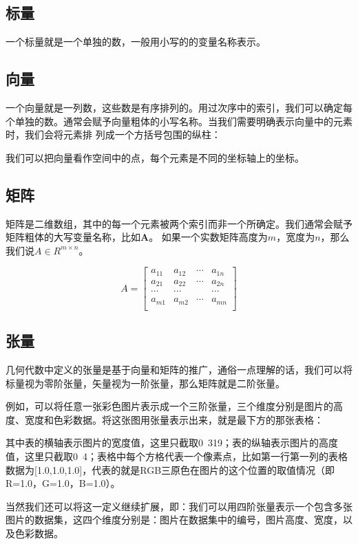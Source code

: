 \documentclass[11pt]{book}
\newcounter{#2}
\newcounter{#2}[#1]
\numberwithin{#2}{#1}
\begin{document}
\subsection{标量}
一个标量就是一个单独的数，一般用小写的的变量名称表示。
\subsection{向量}
一个向量就是一列数，这些数是有序排列的。用过次序中的索引，我们可以确定每个单独的数。通常会赋予向量粗体的小写名称。当我们需要明确表示向量中的元素时，我们会将元素排
列成一个方括号包围的纵柱：

我们可以把向量看作空间中的点，每个元素是不同的坐标轴上的坐标。

\subsection{矩阵}
矩阵是二维数组，其中的每一个元素被两个索引而非一个所确定。我们通常会赋予矩阵粗体的大写变量名称，比如\textbf{A}。 如果一个实数矩阵高度为$ m $，宽度为$ n $，那么我们说$ A \in R^{m \times n} $。
\begin{center}
	\begin{equation}
  A= \begin{bmatrix} a_{11} & a_{12} & \cdots & a_{1n}\\ a_{21} & a_{22} & \cdots & a_{2n}\\ \cdots & \cdots & & \cdots\\ a_{m1} & a_{m2} & \cdots & a_{mn}\\ \end{bmatrix}
  \end{equation}
\end{center}
\subsection{张量}
几何代数中定义的张量是基于向量和矩阵的推广，通俗一点理解的话，我们可以将标量视为零阶张量，矢量视为一阶张量，那么矩阵就是二阶张量。

例如，可以将任意一张彩色图片表示成一个三阶张量，三个维度分别是图片的高度、宽度和色彩数据。将这张图用张量表示出来，就是最下方的那张表格： 


其中表的横轴表示图片的宽度值，这里只截取0~319；表的纵轴表示图片的高度值，这里只截取0~4；表格中每个方格代表一个像素点，比如第一行第一列的表格数据为[1.0,1.0,1.0]，代表的就是RGB三原色在图片的这个位置的取值情况（即R=1.0，G=1.0，B=1.0）。

当然我们还可以将这一定义继续扩展，即：我们可以用四阶张量表示一个包含多张图片的数据集，这四个维度分别是：图片在数据集中的编号，图片高度、宽度，以及色彩数据。
\end{document}
